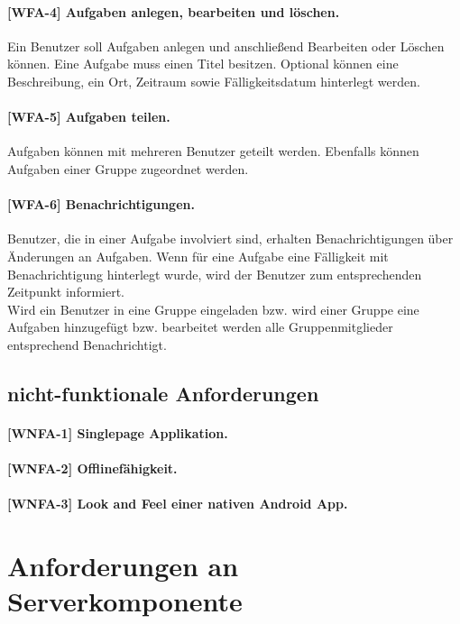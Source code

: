 \paragraph{[WFA-4] Aufgaben anlegen, bearbeiten und löschen.} Ein Benutzer soll Aufgaben anlegen und anschließend Bearbeiten oder Löschen können.
Eine Aufgabe muss einen Titel besitzen. Optional können eine Beschreibung, ein Ort, Zeitraum sowie Fälligkeitsdatum hinterlegt werden.

\paragraph{[WFA-5] Aufgaben teilen.} Aufgaben können mit mehreren Benutzer geteilt werden. Ebenfalls können Aufgaben einer Gruppe zugeordnet werden. 

\paragraph{[WFA-6] Benachrichtigungen.} Benutzer, die in einer Aufgabe involviert sind, erhalten Benachrichtigungen über Änderungen an Aufgaben. Wenn für eine Aufgabe eine Fälligkeit mit Benachrichtigung hinterlegt wurde, wird der Benutzer zum entsprechenden Zeitpunkt informiert.\\
Wird ein Benutzer in eine Gruppe eingeladen bzw. wird einer Gruppe eine Aufgaben hinzugefügt bzw. bearbeitet werden alle Gruppenmitglieder entsprechend Benachrichtigt.

\newpage
\subsection{nicht-funktionale Anforderungen}

\paragraph{[WNFA-1] Singlepage Applikation.}

\paragraph{[WNFA-2] Offlinefähigkeit.}

\paragraph{[WNFA-3] Look and Feel einer nativen Android App.}\label{par_wnfa3}


\newpage
\section{Anforderungen an Serverkomponente}
\label{subsec_anforderungen_server}

